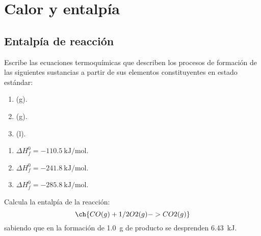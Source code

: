 \section{Calor y entalpía}

  \subsection*{Entalpía de reacción}


    \begin{exercise}[
        tags    = {termodinámica, entalpía, entalpia de reacción, calor},
        topics  = {química, termoquímica, termodinámica},
        source  = {FQ 1B ANA 2016, p164, e5},
      ]
      Escribe las ecuaciones termoquímicas que describen los procesos de formación de las siguientes sustancias a partir de sus elementos constituyentes en estado estándar:
      \begin{enumerate}
        \item {} (g).
        \item {} (g).
        \item {} (l).
      \end{enumerate}
    \end{exercise}

    \begin{solution}
      \begin{enumerate}
        \item {} \( \Delta H^0_f = \SI{-110.5}{\kilo\joule\per\mole} \).
        \item {} \( \Delta H^0_f = \SI{-241.8}{\kilo\joule\per\mole} \).
        \item {} \( \Delta H^0_f = \SI{-285.8}{\kilo\joule\per\mole} \).
      \end{enumerate}
    \end{solution}




    \begin{exercise}[
        tags    = {termodinámica, entalpía, entalpia de reacción, calor},
        topics  = {química, termoquímica, termodinámica},
        source  = {FQ 1B ANA 2016, p165, e14},
      ]
      Calcula la entalpía de la reacción:
      \[ \ch{CO (g) + 1/2 O2 (g) -> CO2 (g)} \]
      sabiendo que en la formación de \SI{1.0}{\gram} de producto se desprenden \SI{6.43}{\kilo\joule}.
    \end{exercise}

